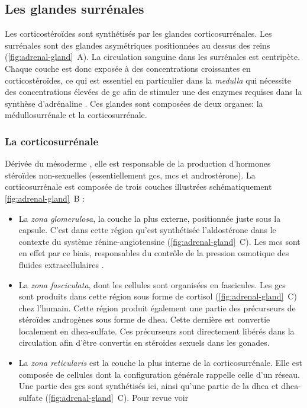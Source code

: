 \documentclass[../main.tex]{subfiles}
\begin{document}

\subsection{Les glandes surrénales}
Les corticostéroïdes sont synthétisés par les glandes corticosurrénales.
Les surrénales sont des glandes asymétriques positionnées au dessus des reins (\autoref{fig:adrenal-gland}~A).
La circulation sanguine dans les surrénales est centripète.
Chaque couche est donc exposée à des concentrations croissantes en corticostéroïdes, ce qui est essentiel en particulier dans la \textit{medulla} qui nécessite des concentrations élevées de \gls{gc} afin de stimuler une des enzymes requises dans la synthèse d'adrénaline \citep{Nussey2001}.
Ces glandes sont composées de deux organes: la médullosurrénale et la corticosurrénale.



\subsubsection{La corticosurrénale}
Dérivée du mésoderme \citep{Hammer2005}, elle est responsable de la production d'hormones stéroïdes non-sexuelles (essentiellement \glspl{gc}, \glspl{mc} et androstérone).
La corticosurrénale est composée de trois couches illustrées schématiquement \autoref{fig:adrenal-gland}~B \citep{Charlton1990,Parker1993} :
\begin{itemize}
\item La \textit{zona glomerulosa}, la couche la plus externe, positionnée juste sous la capsule.
C'est dans cette région qu'est synthétisée l'aldostérone dans le contexte du système rénine-angiotensine (\autoref{fig:adrenal-gland}~C).
Les \glspl{mc} sont en effet par ce biais, responsables du contrôle de la pression osmotique des fluides extracellulaires \citep{Feraco2013}.
\item La \textit{zona fasciculata}, dont les cellules sont organisées en fascicules. Les \glspl{gc} sont produits dans cette région sous forme de cortisol (\autoref{fig:adrenal-gland}~C) chez l'humain.
Cette région produit également une partie des précurseurs de stéroïdes androgènes sous forme de \gls{dhea}.
Cette dernière est convertie localement en \gls{dhea}-sulfate.
Ces précurseurs sont directement libérés dans la circulation afin d'être convertis en stéroides sexuels dans les gonades.
\item La \textit{zona reticularis} est la couche la plus interne de la corticosurrénale.
Elle est composée de cellules dont la configuration générale rappelle celle d'un réseau.
Une partie des \glspl{gc} sont synthétisés ici, ainsi qu'une partie de la \gls{dhea} et \gls{dhea}-sulfate (\autoref{fig:adrenal-gland}~C).
Pour revue voir \citep{McKay2003a}
\end{itemize}
\end{document}
